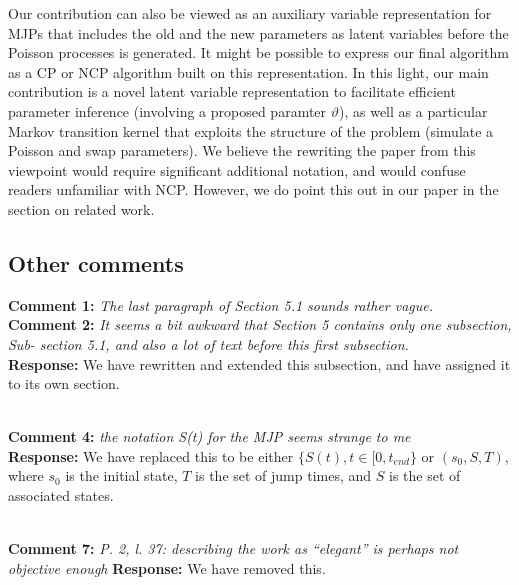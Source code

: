 \documentclass[11pt]{article}
\newcommand{\rev}[2]{\textbf{Comment #1: }\emph{#2}}
\newcommand{\resp}{\textbf{Response: }}
\begin{document}
Our contribution can also be viewed as an auxiliary variable representation for MJPs that includes the old and the new parameters as latent variables before the Poisson processes is generated. 
It might be possible to express our final algorithm as a CP or NCP algorithm built on this representation. 
In this light, our main contribution is a novel latent variable representation to facilitate efficient parameter inference (involving a proposed paramter $\vartheta$), as well as a particular Markov transition kernel that exploits the structure of the problem (simulate a Poisson and swap parameters). We believe the rewriting the paper from this viewpoint would require significant additional notation, and would confuse readers unfamiliar with NCP. However, we do point this out in our paper in the section on related work.


\subsection*{Other comments}
\rev{1}{The last paragraph of Section 5.1 sounds rather vague.} \\ 
\rev{2}{It seems a bit awkward that Section 5 contains only one subsection, Sub- section 5.1, and also a lot of text before this first subsection.}\\ 
\resp We have rewritten and extended this subsection, and have assigned it to its own section.

~\\ 
\rev{4}{the notation S(t) for the MJP seems strange to me} \\
\resp We have replaced this to be either $\{S(t), t \in [0,t_{end}\}$ or $(s_0, S, T)$, where $s_0$ is the initial state, $T$ is the set of jump times, and $S$ is the set of associated states.

~\\
\rev{7}{P. 2, l. 37: describing the work as “elegant” is perhaps not objective enough}
\resp{We have removed this.}
\end{document}
